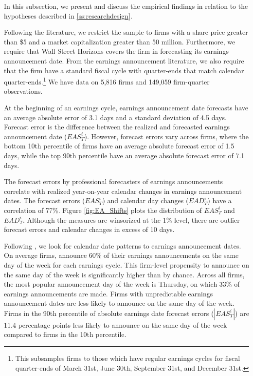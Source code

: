 \documentclass[authoryear,letterpaper,english,12pt]{elsarticle}
\begin{document}
In this subsection, we present and discuss the empirical findings in relation to the hypotheses described in \ref{ss:researchdesign}. 

Following the literature, we restrict the sample to firms with a share price greater than \$5 and a market capitalization greater than 50 million. Furthermore, we require that Wall Street Horizons covers the firm in forecasting its earnings announcement date. From the earnings announcement literature, we also require that the firm have a standard fiscal cycle with quarter-ends that match calendar quarter-ends.\footnote{This subsamples firms to those which have regular earnings cycles for fiscal quarter-ends of March 31st, June 30th, September 31st, and December 31st.} We have data on 5,816 firms and 149,059 firm-quarter observations.

At the beginning of an earnings cycle, earnings announcement date forecasts have an average absolute error of 3.1 days and a standard deviation of 4.5 days. Forecast error is the difference between the realized and forecasted earnings announcement date ($EAS^{i}_{T}$). However, forecast errors vary across firms, where the bottom 10th percentile of firms have an average absolute forecast error of 1.5 days, while the top 90th percentile have an average absolute forecast error of 7.1 days. 

The forecast errors by professional forecasters of earnings announcements correlate with realized year-on-year calendar changes in earnings announcement dates. The forecast errors ($EAS^{i}_{T}$) and calendar day changes ($EAD^{i}_{T}$) have a correlation of 77\%. Figure \ref{fig:EA_Shifts} plots the distribution of $EAS^{i}_{T}$ and $EAD^{i}_{T}$. Although the measures are winsorized at the 1\% level, there are outlier forecast errors and calendar changes in excess of 10 days. 

Following \cite{noh2021calendar}, we look for calendar date patterns to earnings announcement dates. On average firms, announce 60\% of their earnings announcements on the same day of the week for each earnings cycle. This firm-level propensity to announce on the same day of the week is significantly higher than by chance. Across all firms, the most popular announcement day of the week is Thursday, on which 33\% of earnings announcements are made. Firms with unpredictable earnings announcement dates are less likely to announce on the same day of the week. Firms in the 90th percentile of absolute earnings date forecast errors ($|EAS^{i}_{T}|$) are 11.4 percentage points less likely to announce on the same day of the week compared to firms in the 10th percentile. 
\end{document}
